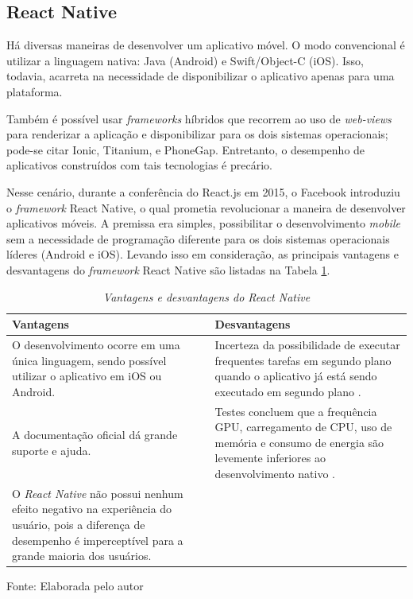 \subsection{React Native} 

Há diversas maneiras de desenvolver um aplicativo móvel. O modo convencional é utilizar a linguagem nativa: Java (Android) e Swift/Object-C (iOS). Isso, todavia, acarreta na necessidade de disponibilizar o aplicativo apenas para uma plataforma. 

Também é possível usar \textit{frameworks} híbridos que recorrem ao uso de \textit{web-views} para renderizar a aplicação e disponibilizar para os dois sistemas operacionais; pode-se citar Ionic, Titanium, e PhoneGap. Entretanto, o desempenho de aplicativos construídos com tais tecnologias é precário. 

Nesse cenário, durante a conferência do React.js em 2015, o Facebook introduziu o \textit{framework} React Native, o qual prometia revolucionar a maneira de desenvolver aplicativos móveis. A premissa era simples, possibilitar o desenvolvimento \textit{mobile} sem a necessidade de programação diferente para os dois sistemas operacionais líderes (Android e iOS). Levando isso em consideração, as principais vantagens e desvantagens do \textit{framework} React Native são listadas na Tabela \ref{tab:vanDesvRN}.

\begin{table}[!ht]
\centering
\caption{\textit{Vantagens e desvantagens do React Native}}
\centering
\footnotesize
\begin{tabular}{p{7cm} p{7cm}}
\toprule
\textbf{Vantagens} \citep{danielsson2016} & \textbf{Desvantagens}                          
\\ \midrule
O desenvolvimento ocorre em uma única linguagem, sendo possível utilizar o aplicativo em iOS ou Android.
& 
Incerteza da possibilidade de executar frequentes tarefas em segundo plano quando o aplicativo já está sendo executado em segundo plano \citep{sodebergJohansson}.
\\ \midrule

A documentação oficial dá grande suporte e ajuda.
& 
Testes concluem que a frequência GPU, carregamento de CPU, uso de memória e consumo de energia são levemente inferiores ao desenvolvimento nativo \citep{danielsson2016}.
\\ \midrule

O \textit{React Native} não possui nenhum efeito negativo na experiência do usuário, pois a diferença de desempenho é imperceptível para a grande maioria dos usuários.
& 

\\ \midrule

\end{tabular}
\label{tab:vanDesvRN}

Fonte: Elaborada pelo autor
\end{table}

